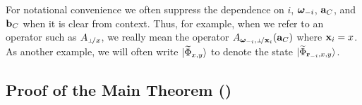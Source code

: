 For notational convenience we often suppress the dependence on $i$, ${\boldsymbol{\omega}}_{-i}$, $\mathbf{a}_C$, and $\mathbf{b}_C$ when it is clear from context. Thus, for example, when we refer to an operator such as $A_\dummyx$, we really mean the operator $A_{\bomega_\mi,\dummy\!/\bx_i}(\ba_C)$ where $\mathbf{x}_i = x$. As another example, we will often write ${|\widetilde{\Phi}_{x,y}\rangle}$ to denote the state ${|\widetilde{\Phi}_{\mathbf{r}_{-i} , x,y}\rangle}$.



%

\subsection{Proof of the Main Theorem ()}


